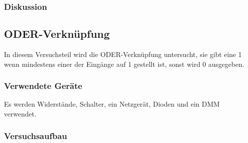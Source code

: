 \documentclass[12pt,a4paper]{article}
\begin{document}
\subsubsection*{Diskussion}


\subsection{ODER-Verknüpfung}

\label{sec:or}

In diesem Versuchsteil wird die ODER-Verknüpfung untersucht, sie gibt eine 1 wenn mindestens einer der Eingänge auf 1 gestellt ist, sonst wird 0 ausgegeben.

\subsubsection*{Verwendete Geräte}

Es werden Widerstände, Schalter, ein Netzgerät, Dioden und ein DMM verwendet.

\subsubsection*{Versuchsaufbau}
\end{document}
